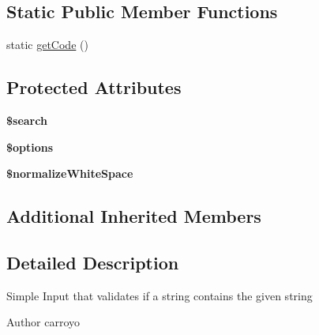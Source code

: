 \subsection*{Static Public Member Functions}
\begin{DoxyCompactItemize}
\item 
static \hyperlink{classDMA_1_1Friends_1_1Classes_1_1Notifications_1_1Inputs_1_1InputContains_a81a8b19854625a3cb7cf011149a0960a}{get\+Code} ()
\end{DoxyCompactItemize}
\subsection*{Protected Attributes}
\begin{DoxyCompactItemize}
\item 
\hypertarget{classDMA_1_1Friends_1_1Classes_1_1Notifications_1_1Inputs_1_1InputContains_abb89a8c2f31d012122a9e55921dc3c64}{{\bfseries \$search}}\label{classDMA_1_1Friends_1_1Classes_1_1Notifications_1_1Inputs_1_1InputContains_abb89a8c2f31d012122a9e55921dc3c64}

\item 
\hypertarget{classDMA_1_1Friends_1_1Classes_1_1Notifications_1_1Inputs_1_1InputContains_ac5addad5295ef180418a1b10080d5a1f}{{\bfseries \$options}}\label{classDMA_1_1Friends_1_1Classes_1_1Notifications_1_1Inputs_1_1InputContains_ac5addad5295ef180418a1b10080d5a1f}

\item 
\hypertarget{classDMA_1_1Friends_1_1Classes_1_1Notifications_1_1Inputs_1_1InputContains_a26ecdaf38bdb16787a09c4e671d63eac}{{\bfseries \$normalize\+White\+Space}}\label{classDMA_1_1Friends_1_1Classes_1_1Notifications_1_1Inputs_1_1InputContains_a26ecdaf38bdb16787a09c4e671d63eac}

\end{DoxyCompactItemize}
\subsection*{Additional Inherited Members}


\subsection{Detailed Description}
Simple Input that validates if a string contains the given string \begin{DoxyAuthor}{Author}
carroyo 
\end{DoxyAuthor}


